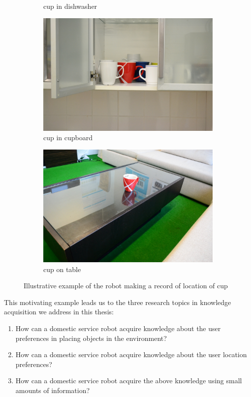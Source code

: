 \begin{figure}[htp]
\begin{subfigure}{.243\textwidth}
    \caption{cup in dishwasher}
\end{subfigure}
\begin{subfigure}{.243\textwidth}
  \centering
  \includegraphics[width=\linewidth]{images/cup_cupboard.jpg}
    \caption{cup in cupboard}
\end{subfigure}
\begin{subfigure}{.243\textwidth}
  \centering
  \includegraphics[width=\linewidth]{images/cup_on_table.jpg}
    \caption{cup on table}
\end{subfigure}

\caption[Illustrative example of robot information collection]{Illustrative example of the robot making a record of location of cup}
\end{figure}

\FloatBarrier
This motivating example leads us to the three research topics in knowledge acquisition we address in this thesis:
\begin{enumerate}
	\item How can a domestic service robot acquire knowledge about the user preferences in placing objects in the environment?
	\item How can a domestic service robot acquire knowledge about the user location preferences?
	\item How can a domestic service robot acquire the above knowledge using small amounts of information?
\end{enumerate}


